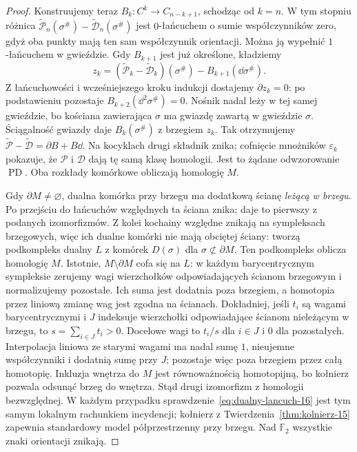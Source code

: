\begin{proof}
Konstruujemy teraz $B_k:C^k\to C_{n-k+1}$,
schodząc od $k=n$. W tym stopniu różnica
$\widetilde{\mathcal P}_n(\sigma^\#)
-\widetilde{\mathcal D}_n(\sigma^\#)$ jest $0$-łańcuchem
o sumie współczynników zero, gdyż oba punkty mają
ten sam współczynnik orientacji.
Można ją wypełnić $1$-łańcuchem w gwieździe.
Gdy $B_{k+1}$ jest już określone, kładziemy
\[
 z_k=(\widetilde{\mathcal P}_k-\widetilde{\mathcal D}_k)(\sigma^\#)
                  -B_{k+1}(\dd\sigma^\#).
\]
Z łańcuchowości i wcześniejszego kroku indukcji dostajemy
$\partial z_k=0$: po podstawieniu pozostaje
$B_{k+2}(\dd^2\sigma^\#)=0$.
Nośnik nadal leży w tej samej gwieździe,
bo kościana zawierająca $\sigma$ ma gwiazdę zawartą
w gwieździe $\sigma$.
Ściągalność gwiazdy daje $B_k(\sigma^\#)$
z brzegiem $z_k$.
Tak otrzymujemy
$\widetilde{\mathcal P}-\widetilde{\mathcal D}
=\partial B+B\dd$.
Na kocyklach drugi składnik znika; cofnięcie
mnożników $\varepsilon_k$ pokazuje, że $\mathcal P$
i $\mathcal D$ dają tę samą klasę homologii.
Jest to żądane odwzorowanie $\operatorname{PD}$.
Oba rozkłady komórkowe obliczają homologię $M$.

Gdy $\partial M\ne\varnothing$,
dualna komórka przy brzegu
ma dodatkową ścianę
\emph{leżącą w brzegu}.
Po przejściu do łańcuchów
względnych ta ściana znika;
daje to pierwszy z podanych
izomorfizmów. Z kolei
kochainy względne znikają
na sympleksach brzegowych,
więc ich dualne komórki
nie mają obciętej ściany:
tworzą podkompleks dualny $L$ z komórek
$D(\sigma)$ dla $\sigma\not\subset\partial M$.
Ten podkompleks oblicza homologię $M$.
Istotnie, $M\setminus\partial M$ cofa się na $L$:
w każdym barycentrycznym sympleksie zerujemy wagi
wierzchołków odpowiadających ścianom brzegowym
i normalizujemy pozostałe. Ich suma jest dodatnia
poza brzegiem, a homotopia przez liniową zmianę wag
jest zgodna na ścianach.
Dokładniej, jeśli $t_i$ są wagami barycentrycznymi
i $J$ indeksuje wierzchołki odpowiadające ścianom
nieleżącym w brzegu, to $s=\sum_{i\in J}t_i>0$.
Docelowe wagi to $t_i/s$ dla $i\in J$ i $0$ dla pozostałych.
Interpolacja liniowa ze starymi wagami ma nadal sumę $1$,
nieujemne współczynniki i dodatnią sumę przy $J$;
pozostaje więc poza brzegiem przez całą homotopię.
Inkluzja wnętrza do $M$
jest równoważnością homotopijną, bo kołnierz pozwala
odsunąć brzeg do wnętrza. Stąd drugi izomorfizm
z homologii bezwzględnej.
W każdym przypadku
sprawdzenie~\eqref{eq:dualny-lancuch-16}
jest tym samym lokalnym
rachunkiem incydencji;
kołnierz z
Twierdzenia~\ref{thm:kolnierz-15}
zapewnia standardowy model
półprzestrzenny przy brzegu.
Nad $\mathbb F_2$ wszystkie
znaki orientacji znikają.
\end{proof}

